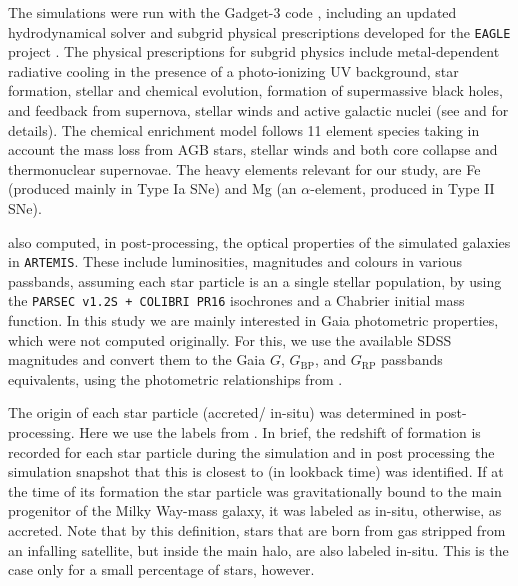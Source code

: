 The simulations were run with the Gadget-3 code \citep{Springel2005b}, including an updated hydrodynamical solver and subgrid physical prescriptions developed for the \texttt{EAGLE} project \citep{Schaye2015}. The physical prescriptions for subgrid physics include metal-dependent radiative cooling in the presence of a photo-ionizing UV background, star formation, stellar and chemical evolution, formation of supermassive black holes, and feedback from supernova, stellar winds and active galactic nuclei (see \citealt{Crain2015} and \citealt{Schaye2015} for details).
The chemical enrichment model follows 11 element species taking in account the mass loss from AGB stars, stellar winds and both core collapse and thermonuclear supernovae. The heavy elements relevant for our study, are Fe (produced mainly in Type Ia SNe) and Mg (an $\alpha$-element, produced in Type II SNe).

\citet{Font2020} also computed, in post-processing, the optical properties of the simulated galaxies in \texttt{ARTEMIS}. These include luminosities, magnitudes and colours in various passbands, assuming each star particle is an a single stellar population, by using the \texttt{PARSEC v1.2S + COLIBRI PR16} isochrones \citep{Bressan2012,Marigo2017} and a Chabrier \citep{Chabrier2003} initial mass function. In this study we are mainly interested in Gaia photometric properties, which were not computed originally. For this, we use the available SDSS magnitudes and convert them to the Gaia $G$, $G_{\mathrm{BP}}$, and $G_{\mathrm{RP}}$ passbands equivalents, using the photometric relationships from \citet{Busso2022}.

The origin of each star particle (accreted/ in-situ) was determined in post-processing. Here we use the labels from \citet{Font2020}.  In brief, the redshift of formation is recorded for each star particle during the simulation and in post processing the simulation snapshot that this is closest to (in lookback time) was identified.  If at the time of its formation the star particle was gravitationally bound to the main progenitor of the Milky Way-mass galaxy, it was labeled as in-situ, otherwise, as accreted. Note that by this definition, stars that are born from gas stripped from an infalling satellite, but inside the main halo, are also labeled in-situ. This is the case only for a small percentage of stars, however.

